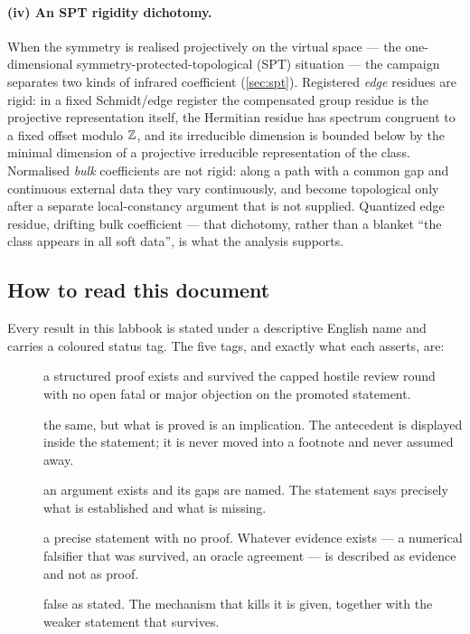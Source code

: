 \paragraph{(iv) An SPT rigidity dichotomy.}
When the symmetry is realised projectively on the virtual space --- the
one-dimensional symmetry-protected-topological (SPT) situation --- the
campaign separates two kinds of infrared coefficient
(\cref{sec:spt}). Registered \emph{edge} residues are rigid: in a fixed
Schmidt/edge register the compensated group residue is the projective
representation itself, the Hermitian residue has spectrum congruent to a
fixed offset modulo $\mathbb{Z}$, and its irreducible dimension is bounded below by
the minimal dimension of a projective irreducible representation of the
class. Normalised \emph{bulk} coefficients are not rigid: along a path with a
common gap and continuous external data they vary continuously, and become
topological only after a separate local-constancy argument that is not
supplied. Quantized edge residue, drifting bulk coefficient --- that
dichotomy, rather than a blanket ``the class appears in all soft data'', is
what the analysis supports.

\subsection{How to read this document}

Every result in this labbook is stated under a descriptive English name and
carries a coloured status tag. The five tags, and exactly what each asserts,
are:

\begin{description}
  \item[\statusProved] a structured proof exists and survived the capped
    hostile review round with no open fatal or major objection on the
    promoted statement.
  \item[\statusProvedConditional] the same, but what is proved is an
    implication. The antecedent is displayed inside the statement; it is
    never moved into a footnote and never assumed away.
  \item[\statusSketch] an argument exists and its gaps are named. The
    statement says precisely what is established and what is missing.
  \item[\statusConjecture] a precise statement with no proof. Whatever
    evidence exists --- a numerical falsifier that was survived, an oracle
    agreement --- is described as evidence and not as proof.
  \item[\statusRefuted] false as stated. The mechanism that kills it is
    given, together with the weaker statement that survives.
\end{description}

